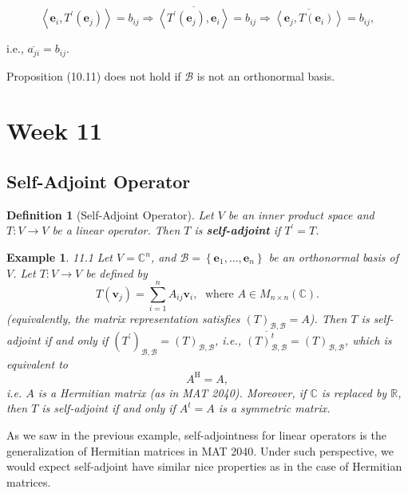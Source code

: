 \documentclass[11pt]{article}
\newtheorem{definition}[theorem]{Definition}
\newtheorem{example}[theorem]{Example}
\begin{document}
\[
\left\langle  {{\mathbf{e}}_{i},{T}^{\prime }\left( {\mathbf{e}}_{j}\right) }\right\rangle   = {b}_{ij} \Rightarrow  \overline{\left\langle  {T}^{\prime }\left( {\mathbf{e}}_{j}\right) ,{\mathbf{e}}_{i}\right\rangle  } = {b}_{ij} \Rightarrow  \overline{\left\langle  {\mathbf{e}}_{j},T\left( {\mathbf{e}}_{i}\right) \right\rangle  } = {b}_{ij},
\]

i.e., \(\overline{{a}_{ji}} = {b}_{ij}\).

Proposition (10.11) does not hold if \(\mathcal{B}\) is not an orthonormal basis.

\newpage
\section{Week 11}

\subsection{Self-Adjoint Operator}

\begin{definition}[Self-Adjoint Operator] Let \(V\) be an inner product space and \(T : V \rightarrow  V\) be a linear operator. Then \(T\) is {\bf self-adjoint} if \({T}^{\prime } = T\).
\end{definition}

\begin{example} 11.1 Let \(V = {\mathbb{C}}^n\), and \(\mathcal{B} = \left\{  {{\mathbf{e}}_1,\ldots ,{\mathbf{e}}_n}\right\}\) be an orthonormal basis of $V$. Let \(T : V \rightarrow  V\) be defined by
\[
T\left( \mathbf{v}_j\right)  = \sum_{i=1}^n A_{ij}\mathbf{v}_i,\;\text{ where }A \in  {M}_{n \times  n}\left( \mathbb{C}\right) .
\]
(equivalently, the matrix representation satisfies \({\left( T\right) }_{\mathcal{B},\mathcal{B}}  = A\)).
Then \(T\) is self-adjoint if and only if \({\left( {T}^{\prime }\right) }_{\mathcal{B},\mathcal{B}} = {\left( T\right) }_{\mathcal{B},\mathcal{B}}\), i.e., \(\overline{{\left( T\right) }_{\mathcal{B},\mathcal{B}}^{t}} = {\left( T\right) }_{\mathcal{B},\mathcal{B}}\), which is equivalent to 
\[A^{\mathrm{H}} = A,\]
i.e. $A$ is a Hermitian matrix (as in MAT 2040). Moreover, if \(\mathbb{C}\) is replaced by \(\mathbb{R}\), then \(T\) is self-adjoint if and only if \(A^t =A\) is a symmetric matrix. 
\end{example}

As we saw in the previous example, self-adjointness for linear operators is the generalization of Hermitian matrices in MAT 2040. Under such perspective, we would expect self-adjoint have similar nice properties as in the case of Hermitian matrices.
\end{document}
